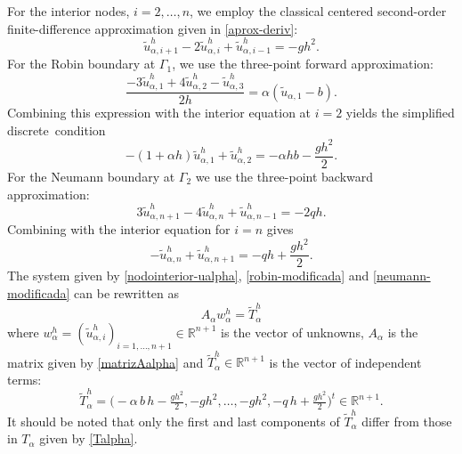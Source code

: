 \documentclass[11pt]{article}
\begin{document}
\begin{flushleft}
For the interior nodes, $i=2,\dots,n$, we employ the classical centered second-order finite-difference approximation given in \eqref{aprox-deriv}:
\begin{equation}\label{nodointerior-ualpha}
{\widetilde{u}^h_{\alpha,i+1}-2\widetilde{u}^h_{\alpha,i}+\widetilde{u}^h_{\alpha,i-1}}=-g h^2.
\end{equation}
For the Robin boundary at $\Gamma_1$, we use the three-point forward approximation:
\begin{equation}
{\frac{-3 \widetilde{u}^h_{\alpha,1} + 4 \widetilde{u}^h_{\alpha,2} - \widetilde{u}^h_{\alpha,3}}{2h}} = \alpha (\widetilde{u}_{\alpha,1}-b).
\end{equation} 
Combining this expression with the interior equation at $i=2$ yields the simplified \mbox{discrete~condition}
\begin{equation}\label{robin-modificada}
{-(1+\alpha h)\widetilde{u}^h_{\alpha,1} + \widetilde{u}^h_{\alpha,2}} =- \alpha h b -\frac{g h^2}{2}.
\end{equation}
For the Neumann boundary at $\Gamma_2$ we use the three-point backward approximation:
\begin{equation}
{3\widetilde{u}^h_{\alpha,n+1}-4\widetilde{u}^h_{\alpha,n}+\widetilde{u}^h_{\alpha,n-1}}=-2 q h.
\end{equation}
Combining with the interior equation for $i=n$ gives
\begin{equation} \label{neumann-modificada}
{-\widetilde{u}^h_{\alpha,n}+\widetilde{u}^h_{\alpha,n+1}}=-q h + \frac{g h^2}{2}.
\end{equation}
The system given by \eqref{nodointerior-ualpha}, \eqref{robin-modificada} and \eqref{neumann-modificada} can be rewritten as 
\begin{equation}\label{sistemaalpha-nuevo}
{ A_\alpha w^h_\alpha=\widetilde{T}^h_\alpha}
\end{equation}
where ${ w^h_\alpha} = ({\widetilde{u}^h_{\alpha, i}})_{i=1,\ldots,n+1}\in\mathbb{R}^{n+1}$ is the vector of unknowns, $A_\alpha$ is the matrix given by \eqref{matrizAalpha} and   ${\widetilde{T}^h_\alpha}\in \mathbb{R}^{n+1}$ is  the vector of independent terms:
   \begin{equation}\label{Talpha*}
 {\widetilde{T}^h_\alpha}= \Big(-\alpha\,b\,h-\tfrac{gh^2}{2}, -g h^2, \ldots, -g h^2, -q\,h+\tfrac{gh^2}{2}  \Big)^t \in  \mathbb{R}^{n+1}.
  \end{equation}
It should be noted that only the first and last components of \({\widetilde{T}^h_\alpha}\)  differ from those in \(T_\alpha\) given by \eqref{Talpha}.
  

\end{flushleft}
\end{document}
